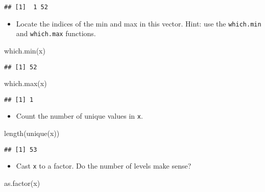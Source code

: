 \documentclass[
]{article}
\newenvironment{Shaded}{\begin{snugshade}}{\end{snugshade}}
\newcommand{\FunctionTok}[1]{\textcolor[rgb]{0.00,0.00,0.00}{#1}}
\newcommand{\NormalTok}[1]{#1}
\providecommand{\tightlist}{%
  \setlength{\itemsep}{0pt}\setlength{\parskip}{0pt}}
\begin{document}
\begin{verbatim}
## [1]  1 52
\end{verbatim}

\begin{itemize}
\tightlist
\item
  Locate the indices of the min and max in this vector. Hint: use the
  \texttt{which.min} and \texttt{which.max} functions.
\end{itemize}

\begin{Shaded}
\begin{Highlighting}[]
\FunctionTok{which.min}\NormalTok{(x)}
\end{Highlighting}
\end{Shaded}

\begin{verbatim}
## [1] 52
\end{verbatim}

\begin{Shaded}
\begin{Highlighting}[]
\FunctionTok{which.max}\NormalTok{(x)}
\end{Highlighting}
\end{Shaded}

\begin{verbatim}
## [1] 1
\end{verbatim}

\begin{itemize}
\tightlist
\item
  Count the number of unique values in \texttt{x}.
\end{itemize}

\begin{Shaded}
\begin{Highlighting}[]
\FunctionTok{length}\NormalTok{(}\FunctionTok{unique}\NormalTok{(x))}
\end{Highlighting}
\end{Shaded}

\begin{verbatim}
## [1] 53
\end{verbatim}

\begin{itemize}
\tightlist
\item
  Cast \texttt{x} to a factor. Do the number of levels make sense?
\end{itemize}

\begin{Shaded}
\begin{Highlighting}[]
\FunctionTok{as.factor}\NormalTok{(x)}
\end{Highlighting}
\end{Shaded}
\end{document}
